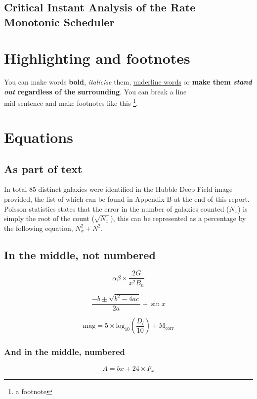 \documentclass{article}
\begin{document}
\subsection{Critical Instant Analysis of the Rate Monotonic Scheduler}









\section{Highlighting and footnotes}
You can make words \textbf{bold}, \textit{italicise} them, \underline{underline words} or \textbf{make them \emph{stand out} regardless of the surrounding}. You can break a line\\ mid sentence and make footnotes like this \footnote{a footnote}.

\section{Equations}


\subsection{As part of text}

In total 85 distinct galaxies were identified in the Hubble Deep Field image provided, the list of which can be found in Appendix B at the end of this report. Poisson statistics states that the error in the number of galaxies counted ($N_x$) is simply the root of the count ($\sqrt{N_x}$), this can be represented as a percentage by the following equation, $N_x^2 + N^2$.

\subsection{In the middle, not numbered} 

$$ \alpha \beta \times \frac{2G}{x^2B_n}$$

$$ \frac{-b \pm \sqrt{b^2-4ac}}{2a} + \sin{x}$$

$$ \mathrm{mag} = 5 \times \mathrm{log}_{10}\left(\frac{D_{l}}{10}\right) + \mathrm{M_{corr}}$$

\subsubsection{And in the middle, numbered}
\begin{equation}
    A=bx+24\times F_x
    \label{eq:lovely formula}
\end{equation}
\end{document}
